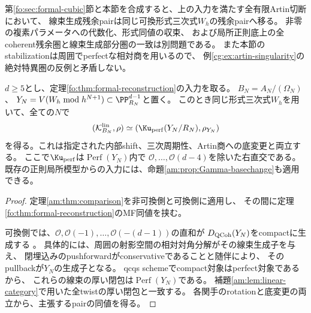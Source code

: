 \begin{remark}[結論の位置づけ]
第\ref{fo:sec:formal-cubic}節と本節を合成すると、上の入力を満たす全有限Artin切断において、
線束生成残余pairは同じ可換形式三次式$W_h$の残余pairへ移る。
非零の複素パラメータへの代数化、形式同値の収束、
および局所正則底上の全coherent残余圏と線束生成部分圏の一致は別問題である。
また本節のstabilizationは周囲でperfectな相対商を用いるので、
例\ref{cg:ex:artin-singularity}の絶対特異圏の反例と矛盾しない。
\end{remark}


\begin{corollary}[全有限Artin切断における可換残余復元]
\label{am:cor:formal-residual}
$d\ge5$とし、定理\ref{fo:thm:formal-reconstruction}の入力を取る。
$B_N=A_N/(\Omega_N)$、
$Y_N=V(W_h\bmod h^{N+1})\subset\PP^{d-1}_{R_N}$と置く。
このとき同じ形式三次式$W_h$を用いて、全ての$N$で
\[
 (\mathcal K_{B_N}^{\rm lin},\rho)
 \simeq
 (\Ku_{\rm perf}(Y_N/R_N),\rho_{Y_N})
\]
を得る。これは指定された内部shift、三次周期性、Artin商への底変更と両立する。
ここで$\Ku_{\rm perf}$は$\operatorname{Perf}(Y_N)$内で
$\mathcal O,\ldots,\mathcal O(d-4)$を除いた右直交である。
既存の正則局所模型からの入力には、命題\ref{am:prop:Gamma-basechange}も適用できる。
\end{corollary}
\begin{proof}
定理\ref{am:thm:comparison}を非可換側と可換側に適用し、
その間に定理\ref{fo:thm:formal-reconstruction}のMF同値を挟む。

可換側では、$\mathcal O,\mathcal O(-1),\ldots,\mathcal O(-(d-1))$の直和が
$D_{\rm QCoh}(Y_N)$をcompactに生成する
\cite[Tag 0BQT, Remark 36.16.4]{AMStacks}。
具体的には、周囲の射影空間の相対対角分解がその線束生成子を与え、
閉埋込みのpushforwardがconservativeであることと随伴により、
そのpullbackが$Y_N$の生成子となる。
qcqs schemeでcompact対象はperfect対象である
\cite[Tag 09M1, Proposition 36.17.1]{AMStacks}から、
これらの線束の厚い閉包は$\operatorname{Perf}(Y_N)$である。
補題\ref{am:lem:linear-category}で用いた全twistの厚い閉包と一致する。
各関手のrotationと底変更の両立から、主張するpairの同値を得る。
\end{proof}
